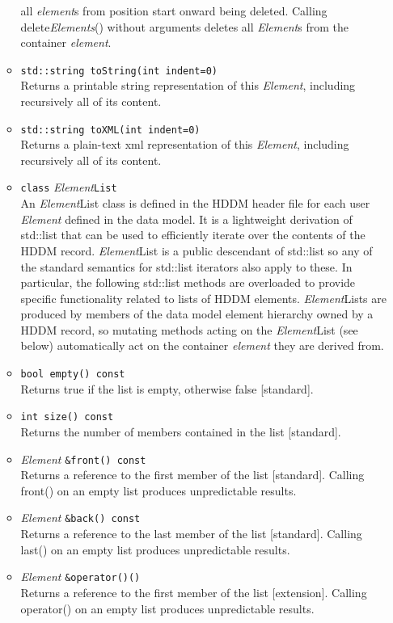 \documentclass{revtex4}
\begin{document}
\begin{itemize}
\begin{itemize}
all {\em element}s from position start onward being deleted. Calling
delete{\em Elements}() without arguments deletes all {\em Element}s
from the container {\em element}.
\item \texttt{std::string toString(int indent=0)}\\
Returns a printable string representation of this {\em Element}, including
recursively all of its content.
\item \texttt{std::string toXML(int indent=0)}\\
Returns a plain-text xml representation of this {\em Element}, including
recursively all of its content.
\item \texttt{class} {\em  Element}\texttt{List}\\
An {\em Element}List class is defined in the HDDM header file for each user
{\em Element}
defined in the data model. It is a lightweight derivation of std::list that
can be used to efficiently iterate over the contents of the HDDM record.
{\em Element}List is a public descendant of std::list so any of the standard
semantics for std::list iterators also apply to these. In particular, the
following std::list methods are overloaded to provide specific functionality
related to lists of HDDM elements. {\em Element}Lists are produced by members
of the data model element hierarchy owned by a HDDM record, so mutating methods
acting on the {\em Element}List (see below) automatically act on the container
{\em element} they are derived from.
\item \texttt{bool empty() const}\\
Returns true if the list is empty, otherwise false [standard].
\item \texttt{int size() const}\\
Returns the number of members contained in the list [standard].
\item {\em Element} \texttt{\&front() const}\\
Returns a reference to the first member of the list [standard]. Calling
front() on an empty list produces unpredictable results.
\item {\em Element} \texttt{\&back() const}\\
Returns a reference to the last member of the list [standard]. Calling last()
on an empty list produces unpredictable results.
\item {\em Element} \texttt{\&operator()()}\\
Returns a reference to the first member of the list [extension]. Calling
operator() on an empty list produces unpredictable results.

\end{itemize}
\end{itemize}
\end{document}
